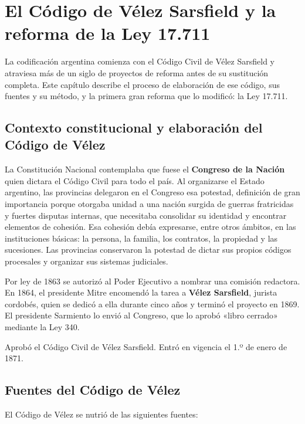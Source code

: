 \documentclass[12pt,oneside]{book}
\begin{document}
\chapter{El Código de Vélez Sarsfield y la reforma de la Ley 17.711}
\label{cap:velez}

La codificación argentina comienza con el Código Civil de Vélez Sarsfield y atraviesa más de un siglo de proyectos de reforma antes de su sustitución completa. Este capítulo describe el proceso de elaboración de ese código, sus fuentes y su método, y la primera gran reforma que lo modificó: la Ley 17.711.

\section{Contexto constitucional y elaboración del Código de Vélez}

La Constitución Nacional contemplaba que fuese el \textbf{Congreso de la Nación} quien dictara el Código Civil para todo el país. Al organizarse el Estado argentino, las provincias delegaron en el Congreso esa potestad, definición de gran importancia porque otorgaba unidad a una nación surgida de guerras fratricidas y fuertes disputas internas, que necesitaba consolidar su identidad y encontrar elementos de cohesión. Esa cohesión debía expresarse, entre otros ámbitos, en las instituciones básicas: la persona, la familia, los contratos, la propiedad y las sucesiones. Las provincias conservaron la potestad de dictar sus propios códigos procesales y organizar sus sistemas judiciales.

Por ley de 1863 se autorizó al Poder Ejecutivo a nombrar una comisión redactora. En 1864, el presidente Mitre encomendó la tarea a \textbf{Vélez Sarsfield}, jurista cordobés, quien se dedicó a ella durante cinco años y terminó el proyecto en 1869. El presidente Sarmiento lo envió al Congreso, que lo aprobó «libro cerrado» mediante la Ley 340.

\begin{importante}[Ley 340 (1869)]
Aprobó el Código Civil de Vélez Sarsfield. Entró en vigencia el 1.º de enero de 1871.
\end{importante}

\section{Fuentes del Código de Vélez}

El Código de Vélez se nutrió de las siguientes fuentes:
\end{document}
